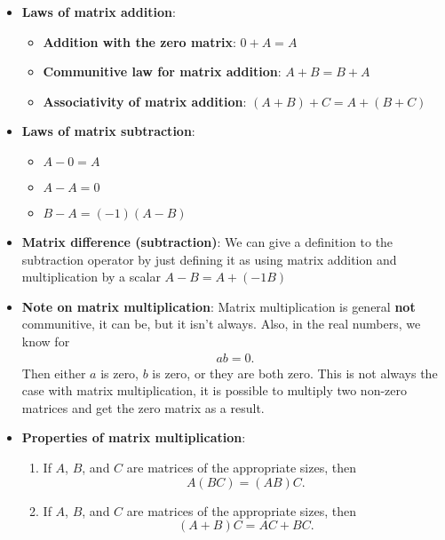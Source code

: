 \documentclass{report}
\begin{document}
    \pagebreak 
    \begin{itemize}
        \item \textbf{Laws of matrix addition}: 
            \begin{itemize}
                \item \textbf{Addition with the zero matrix}:  $0 + A = A $
                \item \textbf{Communitive law for matrix addition}: $A+B = B+A$
                \item \textbf{Associativity of matrix addition}: $(A+B) + C = A + (B+C) $
            \end{itemize}
        \item \textbf{Laws of matrix subtraction}:
            \begin{itemize}
                \item $A - 0 = A $
                \item $A -A = 0 $
                \item $B-A = (-1)(A-B) $
            \end{itemize}
                \item \textbf{Matrix difference (subtraction)}: We can give a definition to the subtraction operator by just defining it as using matrix addition and multiplication by a scalar $A - B = A + (-1B) $
                \item \textbf{Note on matrix multiplication}: Matrix multiplication is general \textbf{not} communitive, it can be, but it isn't always. Also, in the real numbers, we know for
                    \begin{align*}
                        ab = 0
                    .\end{align*}
                    Then either $a$ is zero, $b$ is zero, or they are both zero. This is not always the case with matrix multiplication, it is possible to multiply two non-zero matrices and get the zero matrix as a result.
        \item \textbf{Properties of matrix multiplication}:
            \begin{enumerate}
                \item If \( A \), \( B \), and \( C \) are matrices of the appropriate sizes, then 
                    \[
                        A(BC) = (AB)C.
                    \]
                \item If \( A \), \( B \), and \( C \) are matrices of the appropriate sizes, then 
                    \[
                        (A + B)C = AC + BC.
\]
\end{enumerate}
\end{itemize}
\end{document}

